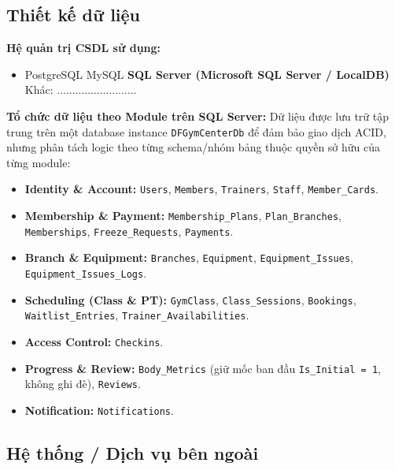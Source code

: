\documentclass[a4paper,12pt]{article}
\begin{document}
\subsection{Thiết kế dữ liệu}
\textbf{Hệ quản trị CSDL sử dụng:}
\begin{itemize}
    \item [$\square$] PostgreSQL \qquad [$\square$] MySQL \qquad [$\boxtimes$] \textbf{SQL Server (Microsoft SQL Server / LocalDB)} \qquad [$\square$] Khác: ..........................
\end{itemize}

\textbf{Tổ chức dữ liệu theo Module trên SQL Server:}
Dữ liệu được lưu trữ tập trung trên một database instance \texttt{DFGymCenterDb} để đảm bảo giao dịch ACID, nhưng phân tách logic theo từng schema/nhóm bảng thuộc quyền sở hữu của từng module:
\begin{itemize}
    \item \textbf{Identity \& Account:} \texttt{Users}, \texttt{Members}, \texttt{Trainers}, \texttt{Staff}, \texttt{Member\_Cards}.
    \item \textbf{Membership \& Payment:} \texttt{Membership\_Plans}, \texttt{Plan\_Branches}, \texttt{Memberships}, \texttt{Freeze\_Requests}, \texttt{Payments}.
    \item \textbf{Branch \& Equipment:} \texttt{Branches}, \texttt{Equipment}, \texttt{Equipment\_Issues}, \texttt{Equipment\_Issues\_Logs}.
    \item \textbf{Scheduling (Class \& PT):} \texttt{GymClass}, \texttt{Class\_Sessions}, \texttt{Bookings}, \texttt{Waitlist\_Entries}, \texttt{Trainer\_Availabilities}.
    \item \textbf{Access Control:} \texttt{Checkins}.
    \item \textbf{Progress \& Review:} \texttt{Body\_Metrics} (giữ mốc ban đầu \texttt{Is\_Initial = 1}, không ghi đè), \texttt{Reviews}.
    \item \textbf{Notification:} \texttt{Notifications}.
\end{itemize}

\subsection{Hệ thống / Dịch vụ bên ngoài}
\end{document}
